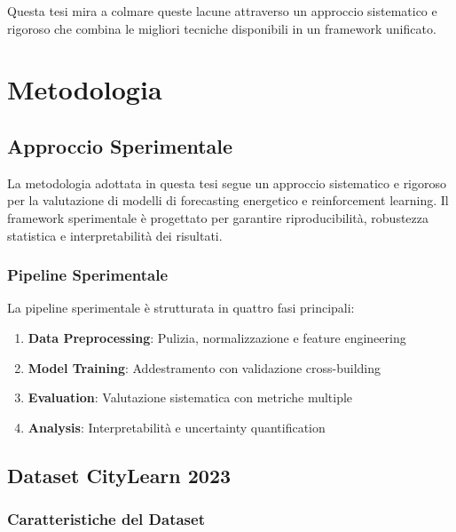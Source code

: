 \documentclass[12pt,a4paper,twoside]{report}
\begin{document}
Questa tesi mira a colmare queste lacune attraverso un approccio sistematico e rigoroso che combina le migliori tecniche disponibili in un framework unificato.



\chapter{Metodologia}

\section{Approccio Sperimentale}

La metodologia adottata in questa tesi segue un approccio sistematico e rigoroso per la valutazione di modelli di forecasting energetico e reinforcement learning. Il framework sperimentale è progettato per garantire riproducibilità, robustezza statistica e interpretabilità dei risultati.

\subsection{Pipeline Sperimentale}

La pipeline sperimentale è strutturata in quattro fasi principali:

\begin{enumerate}
    \item \textbf{Data Preprocessing}: Pulizia, normalizzazione e feature engineering
    \item \textbf{Model Training}: Addestramento con validazione cross-building
    \item \textbf{Evaluation}: Valutazione sistematica con metriche multiple
    \item \textbf{Analysis}: Interpretabilità e uncertainty quantification
\end{enumerate}

\section{Dataset CityLearn 2023}

\subsection{Caratteristiche del Dataset}
\end{document}

